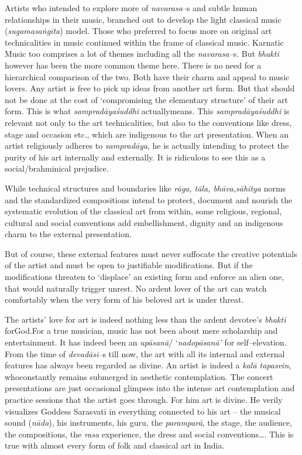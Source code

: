 Artists who intended to explore more of \textit{navarasa–}s and subtle human relationships in their music, branched out to develop the light classical music (\textit{sugama}\textit{saṅgīta}) model. Those who preferred to focus more on original art technicalities in music continued within the frame of classical music. Karnatic Music too comprises a lot of themes including all the \textit{navarasa–}s. But \textit{bhakti} however has been the more common theme here. There is no need for a hierarchical comparison of the two. Both have their charm and appeal to music lovers. Any artist is free to pick up ideas from another art form. But that should not be done at the cost of ‘compromising the elementary structure’ of their art form. This is what \textit{sampradāya}\textit{śuddhi} actuallymeans. This \textit{sampradāya}\textit{śuddhi} is relevant not only to the art technicalities, but also to the conventions like dress, stage and occasion etc., which are indigenous to the art presentation. When an artist religiously adheres to \textit{sampradāya}, he is actually intending to protect the purity of his art internally and externally. It is ridiculous to see this as a social/brahminical prejudice.

While technical structures and boundaries like \textit{rāga, tāla, bhāva,}\textit{sāhitya} norms and the standardized compositions intend to protect, document and nourish the systematic evolution of the classical art from within, some religious, regional, cultural and social conventions add embellishment, dignity and an indigenous charm to the external presentation.

But of course, these external features must never suffocate the creative potentials of the artist and must be open to justifiable modifications. But if the modifications threaten to ‘displace’ an existing form and enforce an alien one, that would naturally trigger unrest. No ardent lover of the art can watch comfortably when the very form of his beloved art is under threat.

The artists’ love for art is indeed nothing less than the ardent devotee’s \textit{bhakti} forGod.For a true musician, music has not been about mere scholarship and entertainment. It has indeed been an \textit{upāsanā}/ ‘\textit{nadopāsanā’} for self–elevation. From the time of \textit{devadāsī–}s till now, the art with all its internal and external features has always been regarded as divine. An artist is indeed a \textit{kalā tapasvin}, whoconstantly remains submerged in aesthetic contemplation. The concert presentations are just occasional glimpses into the intense art contemplation and practice sessions that the artist goes through. For him art is divine. He verily visualizes Goddess Sarasvatī in everything connected to his art – the musical sound (\textit{nāda}), his instruments, his guru, the \textit{paramparā}, the stage, the audience, the compositions, the \textit{rasa} experience, the dress and social conventions…. This is true with almost every form of folk and classical art in India.

